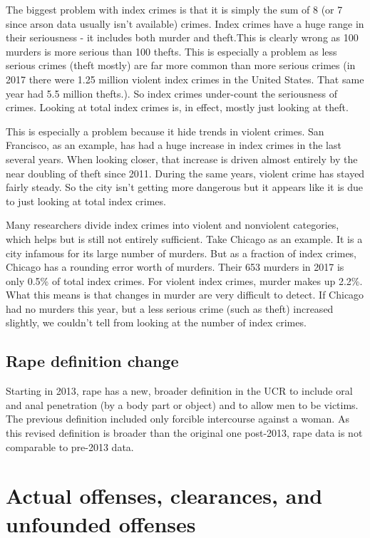 \documentclass[
  12pt,
]{book}
\begin{document}
The biggest problem with index crimes is that it is simply the sum of 8 (or 7 since arson data usually isn't available) crimes. Index crimes have a huge range in their seriousness - it includes both murder and theft.This is clearly wrong as 100 murders is more serious than 100 thefts. This is especially a problem as less serious crimes (theft mostly) are far more common than more serious crimes (in 2017 there were 1.25 million violent index crimes in the United States. That same year had 5.5 million thefts.). So index crimes under-count the seriousness of crimes. Looking at total index crimes is, in effect, mostly just looking at theft.

This is especially a problem because it hide trends in violent crimes. San Francisco, as an example, has had a huge increase in index crimes in the last several years. When looking closer, that increase is driven almost entirely by the near doubling of theft since 2011. During the same years, violent crime has stayed fairly steady. So the city isn't getting more dangerous but it appears like it is due to just looking at total index crimes.

Many researchers divide index crimes into violent and nonviolent categories, which helps but is still not entirely sufficient. Take Chicago as an example. It is a city infamous for its large number of murders. But as a fraction of index crimes, Chicago has a rounding error worth of murders. Their 653 murders in 2017 is only 0.5\% of total index crimes. For violent index crimes, murder makes up 2.2\%. What this means is that changes in murder are very difficult to detect. If Chicago had no murders this year, but a less serious crime (such as theft) increased slightly, we couldn't tell from looking at the number of index crimes.

\hypertarget{rape-definition-change}{%
\subsection{Rape definition change}\label{rape-definition-change}}

Starting in 2013, rape has a new, broader definition in the UCR to include oral and anal penetration (by a body part or object) and to allow men to be victims. The previous definition included only forcible intercourse against a woman. As this revised definition is broader than the original one post-2013, rape data is not comparable to pre-2013 data.

\hypertarget{actual-offenses-clearances-and-unfounded-offenses}{%
\section{Actual offenses, clearances, and unfounded offenses}\label{actual-offenses-clearances-and-unfounded-offenses}}
\end{document}
